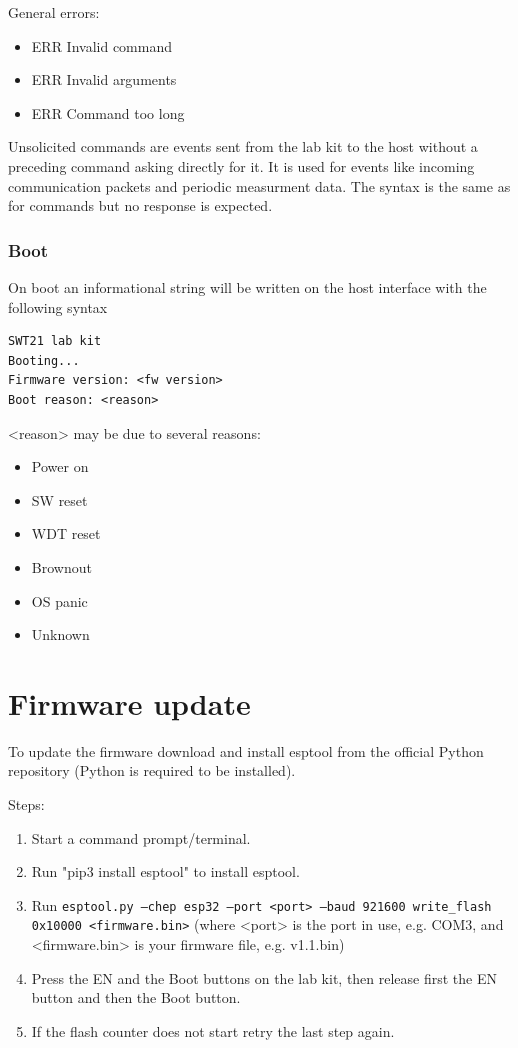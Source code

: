 \documentclass{article}[a4paper]
\begin{document}
General errors:
\begin{itemize}[noitemsep]
\item ERR Invalid command
\item ERR Invalid arguments
\item ERR Command too long
\end{itemize}

Unsolicited commands are events sent from the lab kit to the host without a
preceding command asking directly for it. It is used for events like incoming
communication packets and periodic measurment data. The syntax is the same as
for commands but no response is expected.

\subsubsection{Boot}
On boot an informational string will be written on the host interface with
the following syntax

\begin{verbatim}
SWT21 lab kit
Booting...
Firmware version: <fw version>
Boot reason: <reason>
\end{verbatim}

<reason> may be due to several reasons:
\begin{itemize}[noitemsep]
\item Power on
\item SW reset
\item WDT reset
\item Brownout
\item OS panic
\item Unknown
\end{itemize}

\section{Firmware update}
To update the firmware download and install esptool from the official Python
repository (Python is required to be installed).

Steps:
\begin{enumerate}
\item Start a command prompt/terminal.
\item Run "pip3 install esptool" to install esptool.
\item Run \texttt{esptool.py --chep esp32 --port <port> --baud 921600 write\_flash 0x10000 <firmware.bin>} (where <port> is the port in use, e.g. COM3, and <firmware.bin> is your firmware file, e.g. v1.1.bin)
\item Press the EN and the Boot buttons on the lab kit, then release first the EN
      button and then the Boot button.
\item If the flash counter does not start retry the last step again.
\end{enumerate}
\end{document}
